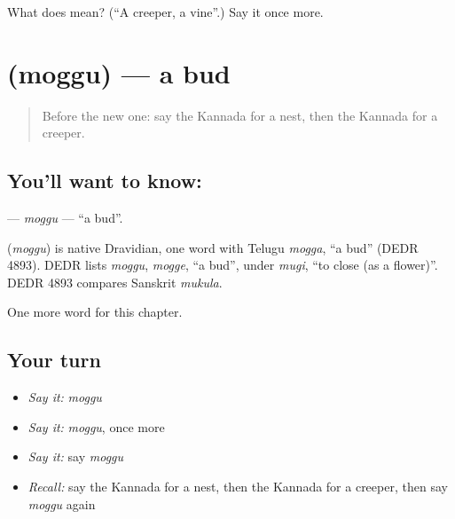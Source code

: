 \begin{tcolorbox}[breakable,colback=teal!4,colframe=teal!35!black,title={Before you move on}]
What does  mean? (\textquotedblleft{}A creeper, a vine\textquotedblright{}.) Say it once more.
\end{tcolorbox}
\section[\texorpdfstring{\kn{ಮೊಗ್ಗು} (moggu)}{ಮೊಗ್ಗು (moggu)}]{ (moggu) — a bud}

\label{lesson:KA-C188-moggu}



\begin{quote}
Before the new one: say the Kannada for a nest, then the Kannada for a creeper.
\end{quote}

\subsection*{You'll want to know: }
\textbf{} — \emph{moggu} — \textquotedblleft{}a bud\textquotedblright{}.

\begin{cousinweb}
\textbf{} (\emph{moggu}) is native Dravidian, one word with Telugu \emph{mogga}, \textquotedblleft{}a bud\textquotedblright{} (DEDR 4893). DEDR lists \emph{moggu}, \emph{mogge}, \textquotedblleft{}a bud\textquotedblright{}, under \emph{mugi}, \textquotedblleft{}to close (as a flower)\textquotedblright{}. DEDR 4893 compares Sanskrit \emph{mukula}.
\end{cousinweb}

\begin{grammarlens}[title={What you've built}]
One more word for this chapter.
\end{grammarlens}

\subsection*{Your turn}
\begin{itemize}
\raggedright
  \item \emph{Say it:} \emph{moggu}
  \item \emph{Say it:} \emph{moggu}, once more
  \item \emph{Say it:} say \emph{moggu}
  \item \emph{Recall:} say the Kannada for a nest, then the Kannada for a creeper, then say \emph{moggu} again
\end{itemize}

